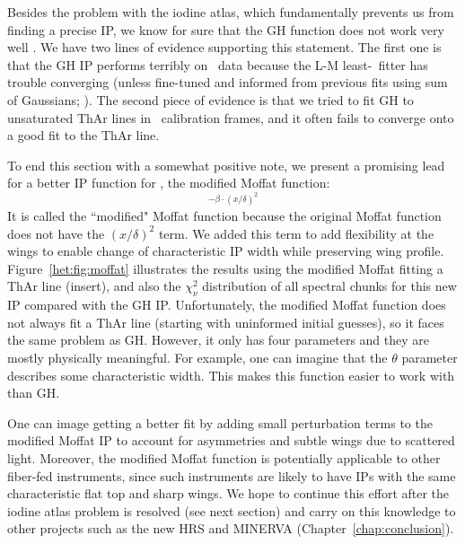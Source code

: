 Besides the problem with the iodine atlas, which fundamentally
prevents us from finding a precise IP, we know for sure that the GH
function does not work very well . We have two lines of evidence
supporting this statement. The first one is that the GH IP performs
terribly on \keck\ data because the L-M least-\chisq\ fitter has
trouble converging (unless fine-tuned and informed from previous fits
using sum of Gaussians; \citealt{2013AAS...22114908V}). The second
piece of evidence is that we tried to fit GH to unsaturated ThAr lines
in \het\ calibration frames, and it often fails to converge onto a
good fit to the ThAr line. 

To end this section with a somewhat positive note, we present a
promising lead for a better IP function for \hrs, the modified Moffat
function:
\begin{equation}
[1+(x/\theta)^2]^{-\beta\cdot(x/\delta)^2}
\end{equation} 
It is called the ``modified" Moffat function because the original
Moffat function does not have the $(x/\delta)^2$ term. We added this
term to add flexibility at the wings to enable change of
characteristic IP width while preserving wing
profile. Figure~\ref{het:fig:moffat} illustrates the results using the
modified Moffat fitting a ThAr line (insert), and also the
$\chi^2_\nu$ distribution of all spectral chunks for this new IP
compared with the GH IP. Unfortunately, the modified Moffat function
does not always fit a ThAr line (starting with uninformed initial
guesses), so it faces the same problem as GH. However, it only has
four parameters and they are mostly physically meaningful. For
example, one can imagine that the $\theta$ parameter describes some
characteristic width. This makes this function easier to work with than
GH.

One can image getting a better fit by adding small perturbation terms
to the modified Moffat IP to account for asymmetries and subtle wings
due to scattered light. Moreover, the modified Moffat function is
potentially applicable to other fiber-fed instruments, since such
instruments are likely to have IPs with the same characteristic flat
top and sharp wings. We hope to continue this effort after the iodine
atlas problem is resolved (see next section) and carry on this
knowledge to other projects such as the new HRS and MINERVA
(Chapter~\ref{chap:conclusion}).


